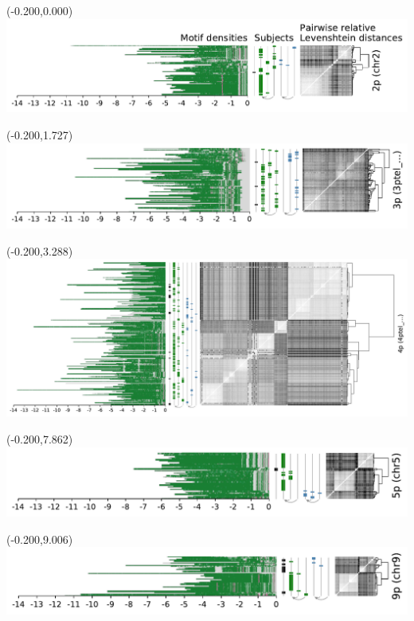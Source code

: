 \documentclass{article}
\begin{document}
\begin{textblock}{13}(-0.200,0.000)\includegraphics{Figure_4/chr2.pdf}\end{textblock}
\begin{textblock}{13}(-0.200,1.727)\includegraphics{Figure_4/3ptel_1-500K_1_12_12.pdf}\end{textblock}
\begin{textblock}{13}(-0.200,3.288)\includegraphics{Figure_4/4ptel_1-500K_1_12_12.pdf}\end{textblock}
\begin{textblock}{13}(-0.200,7.862)\includegraphics{Figure_4/chr5.pdf}\end{textblock}
\begin{textblock}{13}(-0.200,9.006)\includegraphics{Figure_4/chr9.pdf}\end{textblock}
\end{document}
